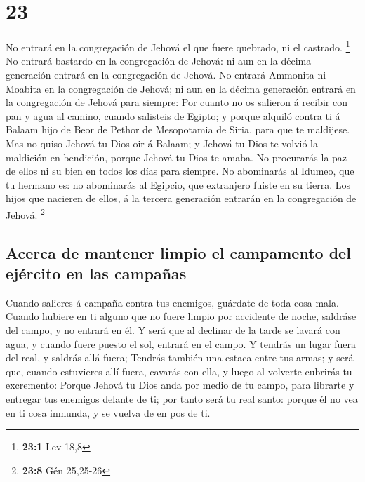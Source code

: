 \hypertarget{section-22}{%
\section{23}\label{section-22}}

 No entrará en la congregación de Jehová el que fuere
quebrado, ni el castrado. \footnote{\textbf{23:1} Lev 18,8} 
No entrará bastardo en la congregación de Jehová: ni aun en la décima
generación entrará en la congregación de Jehová.  No entrará
Ammonita ni Moabita en la congregación de Jehová; ni aun en la décima
generación entrará en la congregación de Jehová para siempre:
 Por cuanto no os salieron á recibir con pan y agua al
camino, cuando salisteis de Egipto; y porque alquiló contra ti á Balaam
hijo de Beor de Pethor de Mesopotamia de Siria, para que te maldijese.
 Mas no quiso Jehová tu Dios oir á Balaam; y Jehová tu Dios
te volvió la maldición en bendición, porque Jehová tu Dios te amaba.
 No procurarás la paz de ellos ni su bien en todos los días
para siempre.  No abominarás al Idumeo, que tu hermano es:
no abominarás al Egipcio, que extranjero fuiste en su tierra.
 Los hijos que nacieren de ellos, á la tercera generación
entrarán en la congregación de Jehová. \footnote{\textbf{23:8} Gén
  25,25-26}

\hypertarget{acerca-de-mantener-limpio-el-campamento-del-ejuxe9rcito-en-las-campauxf1as}{%
\subsection{Acerca de mantener limpio el campamento del ejército en las
campañas}\label{acerca-de-mantener-limpio-el-campamento-del-ejuxe9rcito-en-las-campauxf1as}}

 Cuando salieres á campaña contra tus enemigos, guárdate de
toda cosa mala.  Cuando hubiere en ti alguno que no fuere
limpio por accidente de noche, saldráse del campo, y no entrará en él.
 Y será que al declinar de la tarde se lavará con agua, y
cuando fuere puesto el sol, entrará en el campo.  Y tendrás
un lugar fuera del real, y saldrás allá fuera;  Tendrás
también una estaca entre tus armas; y será que, cuando estuvieres allí
fuera, cavarás con ella, y luego al volverte cubrirás tu excremento:
 Porque Jehová tu Dios anda por medio de tu campo, para
librarte y entregar tus enemigos delante de ti; por tanto será tu real
santo: porque él no vea en ti cosa inmunda, y se vuelva de en pos de ti.

